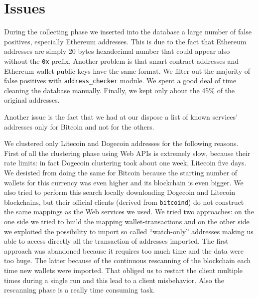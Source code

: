 \section{Issues} \label{sec:issues}
During the collecting phase we inserted into the database a large number of
false positives, especially Ethereum addresses. This is due to the fact that
Ethereum addresses are simply 20 bytes hexadecimal number that could appear
also without the \texttt{0x} prefix. Another problem is that smart contract
addresses and Ethereum wallet public keys have the same format. We filter out
the majority of false positives with \texttt{address\_checker} module. We spent
a good deal of time cleaning the database manually. Finally, we kept only about
the 45\% of the original addresses. 

Another issue is the fact that we had at our dispose a list of known services'
addresses only for Bitcoin and not for the others.

We clustered only Litecoin and Dogecoin addresses for the following reasons.
First of all the clustering phase using Web APIs is extremely slow, because
their rate limits: in fact Dogecoin clustering took about one week, Litecoin
five days.
We desisted from doing the same for Bitcoin because the starting number of
wallets for this currency was even higher and its blockchain is even bigger. We
also tried to perform this search locally downloading Dogecoin and Litecoin
blockchains, but their official clients (derived from \texttt{bitcoind}) do not
construct the same mappings as the Web services we used. We tried two
approaches: on the one side we tried to build the mapping wallet-transactions
and on the other side we exploited the possibility to import so called
``watch-only'' addresses making us able to access directly all the transaction
of addresses imported. The first approach was abandoned because it
requires too much time and the data were too huge. The latter because of the
continuous rescanning of the blockchain each time new wallets were imported.
That obliged us to restart the client multiple times during a single run and
this lead to a client misbehavior. Also the rescanning phase is a really
time consuming task.
